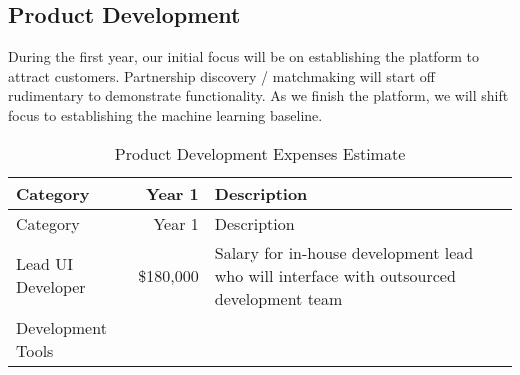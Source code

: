 \documentclass[10pt,openany]{book}
\begin{document}
\hypertarget{product-development}{%
\subsection{Product Development}\label{product-development}}

During the first year, our initial focus will be on establishing the
platform to attract customers. Partnership discovery / matchmaking will
start off rudimentary to demonstrate functionality. As we finish the
platform, we will shift focus to establishing the machine learning
baseline.

\begin{longtable}[]{@{}lrl@{}}
\caption{Product Development Expenses Estimate}\tabularnewline
\toprule
\begin{minipage}[b]{0.41\columnwidth}\raggedright
Category\strut
\end{minipage} & \begin{minipage}[b]{0.11\columnwidth}\raggedleft
Year 1\strut
\end{minipage} & \begin{minipage}[b]{0.39\columnwidth}\raggedright
Description\strut
\end{minipage}\tabularnewline
\midrule
\endfirsthead
\toprule
\begin{minipage}[b]{0.41\columnwidth}\raggedright
Category\strut
\end{minipage} & \begin{minipage}[b]{0.11\columnwidth}\raggedleft
Year 1\strut
\end{minipage} & \begin{minipage}[b]{0.39\columnwidth}\raggedright
Description\strut
\end{minipage}\tabularnewline
\midrule
\endhead
\begin{minipage}[t]{0.41\columnwidth}\raggedright
Lead UI Developer\strut
\end{minipage} & \begin{minipage}[t]{0.11\columnwidth}\raggedleft
\$180,000\strut
\end{minipage} & \begin{minipage}[t]{0.39\columnwidth}\raggedright
Salary for in-house development lead who will interface with outsourced
development team\strut
\end{minipage}\tabularnewline
\begin{minipage}[t]{0.41\columnwidth}\raggedright
Development Tools\strut
\end{minipage} & \begin{minipage}[t]{0.11\columnwidth}\raggedleft

\end{minipage}
\end{longtable}
\end{document}
